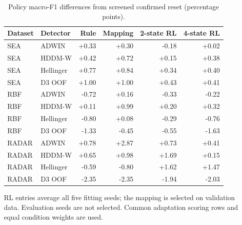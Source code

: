 \begin{table}[H]
\centering\small\singlespacing
\caption{Policy macro-F1 differences from screened confirmed reset (percentage points).}\label{tab:rl}
\setlength{\tabcolsep}{4pt}
\renewcommand{\arraystretch}{1.18}
\begin{tabular}{@{}llrrrr@{}}
\toprule
Dataset & Detector & Rule & Mapping & 2-state RL & 4-state RL \\
\midrule
SEA & ADWIN & +0.33 & +0.30 & -0.18 & +0.02 \\
SEA & HDDM-W & +0.42 & +0.72 & +0.15 & +0.38 \\
SEA & Hellinger & +0.77 & +0.84 & +0.34 & +0.40 \\
SEA & D3 OOF & +1.00 & +1.00 & +0.43 & +0.41 \\
RBF & ADWIN & -0.72 & +0.16 & -0.33 & -0.22 \\
RBF & HDDM-W & +0.11 & +0.99 & +0.20 & +0.32 \\
RBF & Hellinger & -0.80 & +0.08 & -0.29 & -0.76 \\
RBF & D3 OOF & -1.33 & -0.45 & -0.55 & -1.63 \\
RADAR & ADWIN & +0.78 & +2.87 & +0.73 & +0.41 \\
RADAR & HDDM-W & +0.65 & +0.98 & +1.69 & +0.15 \\
RADAR & Hellinger & -0.59 & -0.80 & +1.62 & +1.47 \\
RADAR & D3 OOF & -2.35 & -2.35 & -1.94 & -2.03 \\
\bottomrule
\end{tabular}
\par\smallskip\begin{minipage}{\textwidth}\footnotesize RL entries average all five fitting seeds; the mapping is selected on validation data. Evaluation seeds are not selected. Common adaptation scoring rows and equal condition weights are used.\end{minipage}
\end{table}
